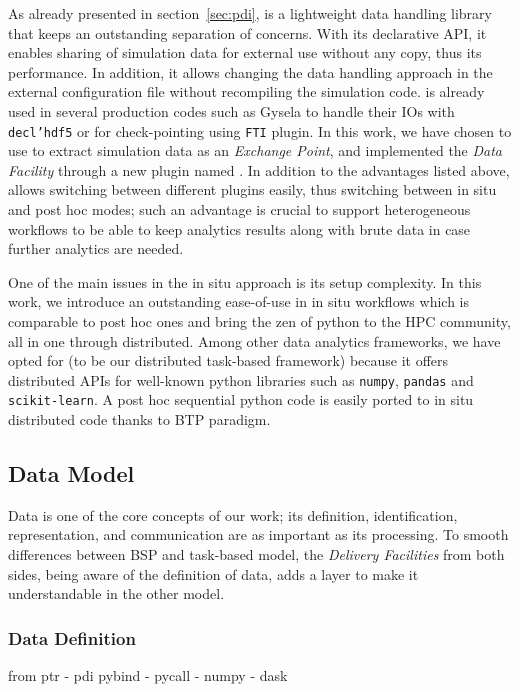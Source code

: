 As already presented in section~\ref{sec:pdi}, \pdi is a lightweight data handling library that keeps an outstanding separation of concerns. With its declarative API, it enables sharing of simulation data for external use without any copy, thus its performance. In addition, it allows changing the data handling approach in the external configuration file without recompiling the simulation code. \pdi is already used in several production codes such as Gysela\cite{bigot:hal-01050322-gysela, latu:hal-01834323-gysela, latu:hal-01719208-gysela} to handle their IOs with \texttt{decl'hdf5} or for check-pointing using \texttt{FTI} plugin.      
In this work, we have chosen to use \pdi to extract simulation data as an \textit{Exchange Point}, and implemented the \textit{Data Facility} through a new \pdi plugin named \deisa. In addition to the advantages listed above, \pdi allows switching between different plugins easily, thus switching between in situ and post hoc modes; such an advantage is crucial to support heterogeneous workflows to be able to keep analytics results along with brute data in case further analytics are needed. 

One of the main issues in the in situ approach is its setup complexity. In this work, we introduce an outstanding ease-of-use in in situ workflows which is comparable to post hoc ones and bring the zen of python to the HPC community, all in one through \dask distributed. Among other data analytics frameworks, we have opted for \dask (to be our distributed task-based framework) because it offers distributed APIs for well-known python libraries such as \texttt{numpy}, \texttt{pandas} and \texttt{scikit-learn}. A post hoc sequential python code is easily ported to in situ distributed \dask code thanks to BTP paradigm.     




\subsection{Data Model}\label{sec:datamodel}
Data is one of the core concepts of our work; its definition, identification, representation, and communication are as important as its processing. To smooth  differences between BSP and task-based model, the \textit{Delivery Facilities} from both sides, being aware of the definition of data, adds a layer to make it understandable in the other model.    

\subsubsection{Data Definition}\label{sec:datamodel:datadef}
from ptr - pdi pybind -  pycall - numpy - dask

